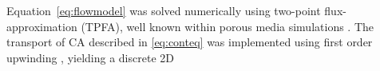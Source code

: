 \documentclass[journal,twocolumn]{IEEEtran}
\begin{document}
	Equation~\eqref{eq:flowmodel} was solved numerically using two-point flux-approximation (TPFA), well known within porous media simulations \cite{Aarnes2007}.
	The transport of CA described in \eqref{eq:conteq} was implemented using first order upwinding \cite{Patankar80}, yielding a discrete 2D
\end{document}
